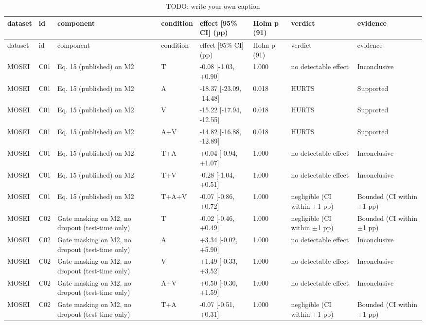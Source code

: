 \begin{landscape}
{\scriptsize
\begin{xltabular}{\linewidth}{ll>{\raggedright\arraybackslash}Xlll>{\raggedright\arraybackslash}X>{\raggedright\arraybackslash}X}
\caption{TODO: write your own caption}\label{tab:T07b-ablation-secondary-by-condition} \\
\toprule
dataset & id & component & condition & effect [95\% CI] (pp) & Holm p (91) & verdict & evidence \\
\midrule
\endfirsthead
\toprule
dataset & id & component & condition & effect [95\% CI] (pp) & Holm p (91) & verdict & evidence \\
\midrule
\endhead
\bottomrule
\endfoot
MOSEI & C01 & Eq. 15 (published) on M2 & T & -0.08 [-1.03, +0.90] & 1.000 & no detectable effect & Inconclusive \\
MOSEI & C01 & Eq. 15 (published) on M2 & A & -18.37 [-23.09, -14.48] & 0.018 & HURTS & Supported \\
MOSEI & C01 & Eq. 15 (published) on M2 & V & -15.22 [-17.94, -12.55] & 0.018 & HURTS & Supported \\
MOSEI & C01 & Eq. 15 (published) on M2 & A+V & -14.82 [-16.88, -12.89] & 0.018 & HURTS & Supported \\
MOSEI & C01 & Eq. 15 (published) on M2 & T+A & +0.04 [-0.94, +1.07] & 1.000 & no detectable effect & Inconclusive \\
MOSEI & C01 & Eq. 15 (published) on M2 & T+V & -0.28 [-1.04, +0.51] & 1.000 & no detectable effect & Inconclusive \\
MOSEI & C01 & Eq. 15 (published) on M2 & T+A+V & -0.07 [-0.86, +0.72] & 1.000 & negligible (CI within $\pm$1 pp) & Bounded (CI within $\pm$1 pp) \\
MOSEI & C02 & Gate masking on M2, no dropout (test-time only) & T & -0.02 [-0.46, +0.49] & 1.000 & negligible (CI within $\pm$1 pp) & Bounded (CI within $\pm$1 pp) \\
MOSEI & C02 & Gate masking on M2, no dropout (test-time only) & A & +3.34 [-0.02, +5.90] & 1.000 & no detectable effect & Inconclusive \\
MOSEI & C02 & Gate masking on M2, no dropout (test-time only) & V & +1.49 [-0.33, +3.52] & 1.000 & no detectable effect & Inconclusive \\
MOSEI & C02 & Gate masking on M2, no dropout (test-time only) & A+V & +0.50 [-0.30, +1.59] & 1.000 & no detectable effect & Inconclusive \\
MOSEI & C02 & Gate masking on M2, no dropout (test-time only) & T+A & -0.07 [-0.51, +0.31] & 1.000 & negligible (CI within $\pm$1 pp) & Bounded (CI within $\pm$1 pp) \\

\end{xltabular}}
\end{landscape}
